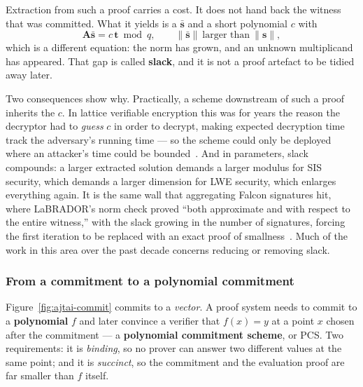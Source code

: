 Extraction from such a proof carries a cost. It does not hand back the witness
that was committed. What it yields is a
$\bar{\mathbf{s}}$ and a short polynomial $c$ with
\[
  \mathbf{A}\bar{\mathbf{s}} = c\,\mathbf{t} \bmod q,
  \qquad \|\bar{\mathbf{s}}\| \ \text{larger than}\ \|\mathbf{s}\| ,
\]
which is a different equation: the norm has grown, and an unknown multiplicand
has appeared. That gap is called \textbf{slack}, and it is not a proof artefact
to be tidied away later.

Two consequences show why. Practically, a scheme downstream of such a proof
inherits the $c$. In lattice verifiable encryption this was for years the reason
the decryptor had to \emph{guess} $c$ in order to decrypt, making expected
decryption time track the adversary's running time --- so the scheme could only
be deployed where an attacker's time could be bounded~\cite{lnp2022}. And in
parameters, slack compounds: a larger extracted solution demands a larger modulus
for SIS security, which demands a larger dimension for LWE security, which
enlarges everything again. It is the same wall that aggregating Falcon signatures
hit, where LaBRADOR's norm check proved ``both approximate and with respect to
the entire witness,'' with the slack growing in the number of signatures, forcing
the first iteration to be replaced with an exact proof of
smallness~\cite{falconagg2024}. Much of the work in this area over the past
decade concerns reducing or removing slack.

\subsubsection{From a commitment to a polynomial commitment}
Figure~\ref{fig:ajtai-commit} commits to a \emph{vector}. A proof system needs
to commit to a \textbf{polynomial} $f$ and later convince a verifier that
$f(x)=y$ at a point $x$ chosen after the commitment --- a \textbf{polynomial
commitment scheme}, or PCS. Two requirements: it is \emph{binding}, so no prover
can answer two different values at the same point; and it is \emph{succinct}, so
the commitment and the evaluation proof are far smaller than $f$ itself.

